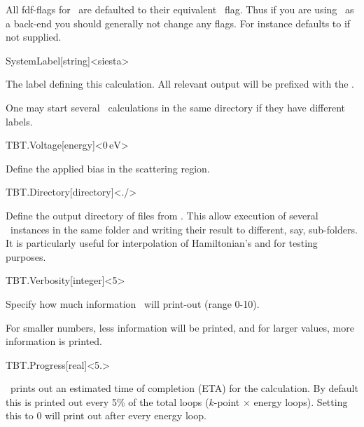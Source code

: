 All fdf-flags for \tbtrans\ are defaulted to their equivalent
\tsiesta\ flag. Thus if you are using \tsiesta\ as a back-end you
should generally not change any flags. For instance 
defaults to  if not supplied.

\begin{fdfentry}{SystemLabel}[string]<siesta>

  The label defining this calculation. All relevant output will be
  prefixed with the .

  One may start several \tbtrans\ calculations in the same directory
  if they have different labels.

\end{fdfentry}

\begin{fdfentry}{TBT.Voltage}[energy]<$0\,\mathrm{eV}$>
  
  Define the applied bias in the scattering region. 

\end{fdfentry}

\begin{fdfentry}{TBT.Directory}[directory]<./>

  Define the output directory of files from \tbtrans. This allow
  execution of several \tbtrans\ instances in the same folder and
  writing their result to different, say, sub-folders. It is
  particularly useful for interpolation of Hamiltonian's and for
  testing purposes.
  
\end{fdfentry}

\begin{fdfentry}{TBT.Verbosity}[integer]<5>

  Specify how much information \tbtrans\ will print-out (range 0-10).

  For smaller numbers, less information will be printed, and for
  larger values, more information is printed.
  
\end{fdfentry}

\begin{fdfentry}{TBT.Progress}[real]<5.>

  \tbtrans\ prints out an estimated time of completion (ETA) for the
  calculation. By default this is printed out every 5\% of the
  total loops ($k$-point $\times$ energy loops). Setting this to 0
  will print out after every energy loop.
  
\end{fdfentry}



